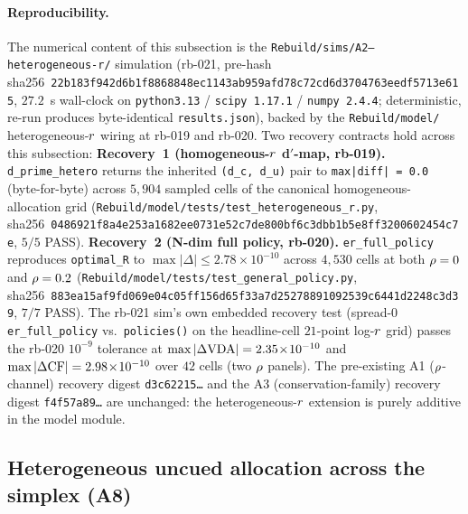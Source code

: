 \paragraph{Reproducibility.}
The numerical content of this subsection is the
\texttt{Rebuild/sims/A2--heterogeneous-r/} simulation (rb-021,
pre-hash sha256~\texttt{22b183f942d6b1f8868848ec1143ab959afd78c72cd6d3704763eedf5713e615},
$27.2$~s wall-clock on \texttt{python3.13} / \texttt{scipy 1.17.1} /
\texttt{numpy 2.4.4}; deterministic, re-run produces byte-identical
\texttt{results.json}), backed by the \texttt{Rebuild/model/}
heterogeneous-$r$ wiring at rb-019 and rb-020. Two recovery
contracts hold across this subsection: \textbf{Recovery~1
(homogeneous-$r$ d$'$-map, rb-019).} \texttt{d\_prime\_hetero}
returns the inherited \texttt{(d\_c, d\_u)} pair to
\texttt{max|diff| = 0.0} (byte-for-byte) across $5{,}904$ sampled
cells of the canonical homogeneous-allocation grid
(\texttt{Rebuild/model/tests/test\_heterogeneous\_r.py},
sha256~\texttt{0486921f8a4e253a1682ee0731e52c7de800bf6c3dbb1b5e8ff3200602454c7e},
$5/5$ PASS). \textbf{Recovery~2 (N-dim full policy, rb-020).}
\texttt{er\_full\_policy} reproduces \texttt{optimal\_R} to
$\max|\Delta| \le 2.78\!\times\!10^{-10}$ across $4{,}530$ cells at
both $\rho = 0$ and $\rho = 0.2$
(\texttt{Rebuild/model/tests/test\_general\_policy.py},
sha256~\texttt{883ea15af9fd069e04c05ff156d65f33a7d25278891092539c6441d2248c3d39},
$7/7$ PASS). The rb-021 sim's own embedded recovery test (spread-$0$
\texttt{er\_full\_policy} vs.\ \texttt{policies()} on the headline-cell
$21$-point log-$r$ grid) passes the rb-020 $10^{-9}$ tolerance at
$\max|\Delta\mathrm{VDA}| = 2.35\!\times\!10^{-10}$ and
$\max|\Delta\mathrm{CF}| = 2.98\!\times\!10^{-10}$ over $42$ cells (two
$\rho$ panels). The pre-existing A1 ($\rho$-channel) recovery
digest \texttt{d3c62215\ldots} and the A3 (conservation-family)
recovery digest \texttt{f4f57a89\ldots} are unchanged: the
heterogeneous-$r$ extension is purely additive in the model
module.

\subsection{Heterogeneous uncued allocation across the simplex (A8)}
\label{sec:extensions-a8}

